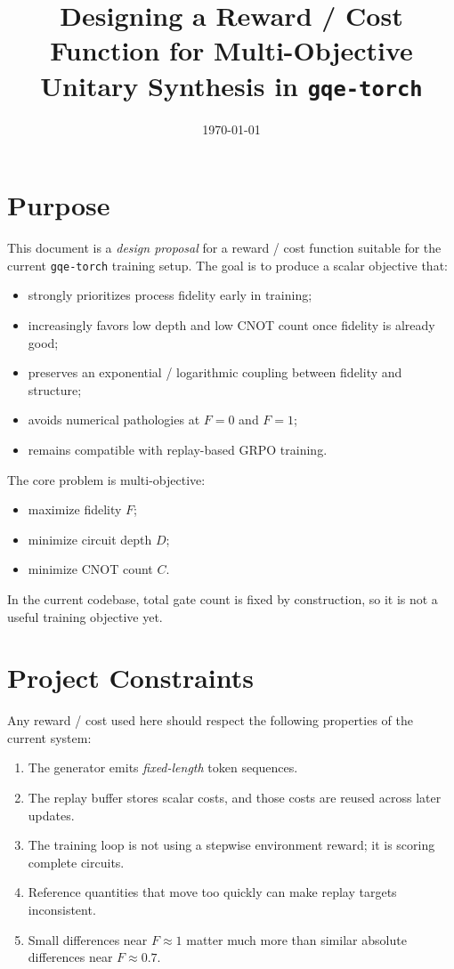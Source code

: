 \documentclass[11pt]{article}
\title{Designing a Reward / Cost Function for Multi-Objective Unitary Synthesis in \texttt{gqe-torch}}
\author{}
\date{\today}
\begin{document}
\maketitle
\tableofcontents

\section{Purpose}

This document is a \emph{design proposal} for a reward / cost function suitable for
the current \texttt{gqe-torch} training setup.
The goal is to produce a scalar objective that:

\begin{itemize}[leftmargin=*]
\item strongly prioritizes process fidelity early in training;
\item increasingly favors low depth and low CNOT count once fidelity is already good;
\item preserves an exponential / logarithmic coupling between fidelity and structure;
\item avoids numerical pathologies at $F=0$ and $F=1$;
\item remains compatible with replay-based GRPO training.
\end{itemize}

The core problem is multi-objective:

\begin{itemize}[leftmargin=*]
\item maximize fidelity $F$;
\item minimize circuit depth $D$;
\item minimize CNOT count $C$.
\end{itemize}

In the current codebase, total gate count is fixed by construction, so it is not a useful
training objective yet.

\section{Project Constraints}

Any reward / cost used here should respect the following properties of the current system:

\begin{enumerate}[leftmargin=*]
\item The generator emits \emph{fixed-length} token sequences.
\item The replay buffer stores scalar costs, and those costs are reused across later updates.
\item The training loop is not using a stepwise environment reward; it is scoring complete circuits.
\item Reference quantities that move too quickly can make replay targets inconsistent.
\item Small differences near $F \approx 1$ matter much more than similar absolute differences near $F \approx 0.7$.
\end{enumerate}
\end{document}
